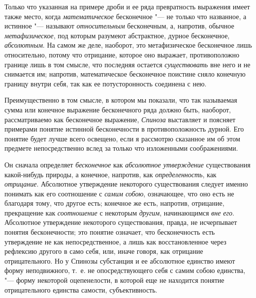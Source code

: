 Только что указанная на примере дроби и ее ряда превратность выражения имеет
также место, когда {\em математическое} бесконечное
"--- не только что названное, а истинное "--- называют
{\em относительным} бесконечным, а, напротив, обычное
{\em метафизическое}, под которым разумеют абстрактное,
дурное бесконечное, {\em абсолютным}. На самом же деле,
наоборот, это метафизическое бесконечное лишь относительно, потому что
отрицание, которое оно выражает, противоположно границе лишь в том смысле,
что последняя остается {\em существовать} вне него и не
снимается им; напротив, математическое бесконечное поистине сняло конечную
границу внутри себя, так как ее
потусторонность соединена с нею.\label{bkm:bm52b}

Преимущественно в том смысле, в котором мы показали, что так называемая
сумма или конечное выражение бесконечного ряда должно быть, наоборот,
рассматриваемо как бесконечное выражение, {\em Спиноза}
выставляет и поясняет примерами понятие истинной бесконечности в
противоположность дурной. Его понятие будет лучше всего освещено, если я
рассмотрю сказанное им об этом предмете непосредственно вслед за только что
изложенными соображениями.

Он сначала определяет {\em бесконечное} как
{\em абсолютное утверждение} существования какой-нибудь
природы, а конечное, напротив, как
{\em определенность}, как
{\em отрицание}. Абсолютное утверждение некоторого
существования следует именно понимать как его соотношение с
{\em самим собою}, означающее, что оно есть не
благодаря тому, что другое есть; конечное же есть, напротив, отрицание,
прекращение как {\em соотношение} с некоторым
{\em другим}, начинающимся {\em вне
его}. Абсолютное утверждение некоторого существования, правда, не
исчерпывает понятия бесконечности; это понятие означает, что бесконечность
есть утверждение не как непосредственное, а лишь как восстановленное через
рефлексию другого в само себя, или, иначе говоря, как отрицание
отрицательного. Но у Спинозы субстанция и ее абсолютное единство имеют
форму неподвижного, т.~е. не опосредствующего себя с самим собою единства,
"--- форму некоторой оцепенелости, в которой еще не находится понятие
отрицательного единства самости, субъективность.

